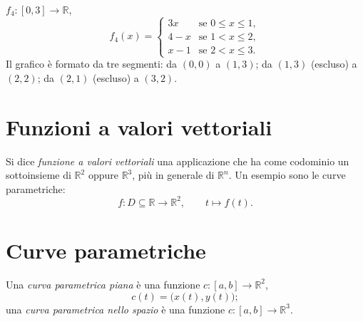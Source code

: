 \documentclass[11pt,a4paper]{article}
\begin{document}
\begin{esempio}
$f_4 : [0, 3] \to \mathbb{R}$,
\[
f_4(x) = \begin{cases}
3x & \text{se } 0 \leq x \leq 1, \\
4 - x & \text{se } 1 < x \leq 2, \\
x - 1 & \text{se } 2 < x \leq 3.
\end{cases}
\]
Il grafico è formato da tre segmenti: da $(0, 0)$ a $(1, 3)$; da $(1, 3)$ (escluso) a $(2, 2)$; da $(2, 1)$ (escluso) a $(3, 2)$.
\end{esempio}

\begin{center}
\end{center}

\section{Funzioni a valori vettoriali}

\begin{definizione}
Si dice \emph{funzione a valori vettoriali} una applicazione che ha come codominio un sottoinsieme di $\mathbb{R}^2$ oppure $\mathbb{R}^3$, più in generale di $\mathbb{R}^n$. Un esempio sono le curve parametriche:
\[
f : D \subseteq \mathbb{R} \to \mathbb{R}^2, \qquad t \mapsto f(t).
\]
\end{definizione}

\section{Curve parametriche}

\begin{definizione}
Una \emph{curva parametrica piana} è una funzione $c : [a, b] \to \mathbb{R}^2$,
\[
c(t) = \big(x(t), y(t)\big);
\]
una \emph{curva parametrica nello spazio} è una funzione $c : [a, b] \to \mathbb{R}^3$.
\end{definizione}
\end{document}
